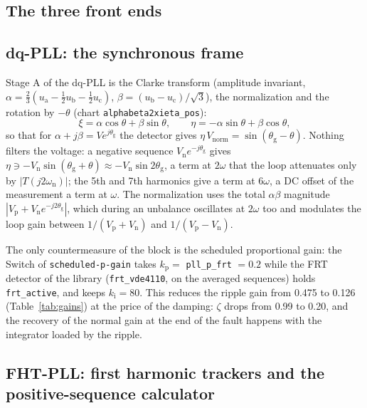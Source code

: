 \documentclass[11pt,a4paper]{scrartcl}
\newcommand{\ped}[1]{_{\mathrm{#1}}}
\newcommand{\code}[1]{\texttt{#1}}
\begin{document}
\begin{onehalfspace}
\section{The three front ends}
\label{sec:frontends}

\subsection{dq-PLL: the synchronous frame}
\label{sec:dq}

Stage A of the dq-PLL is the Clarke transform (amplitude invariant, $\alpha = \tfrac{2}{3}(u\ped{a} - \tfrac{1}{2}u\ped{b} - \tfrac{1}{2}u\ped{c})$, $\beta = (u\ped{b} - u\ped{c})/\sqrt{3}$), the normalization and the rotation by $-\theta$ (chart \code{alphabeta2xieta\_pos}):
\begin{equation}
	\xi = \alpha\cos\theta + \beta\sin\theta, \qquad \eta = -\alpha\sin\theta + \beta\cos\theta,
	\label{eq:rotpos}
\end{equation}
so that for $\alpha + j\beta = V e^{j\theta\ped{g}}$ the detector gives $\eta\, V\ped{norm} = \sin(\theta\ped{g} - \theta)$. Nothing filters the voltage: a negative sequence $V\ped{n} e^{-j\theta\ped{g}}$ gives $\eta \ni -V\ped{n}\sin(\theta\ped{g}+\theta) \approx -V\ped{n}\sin 2\theta\ped{g}$, a term at $2\omega$ that the loop attenuates only by $|T(j2\omega\ped{n})|$; the 5th and 7th harmonics give a term at $6\omega$, a DC offset of the measurement a term at $\omega$. The normalization uses the total $\alpha\beta$ magnitude $|V\ped{p} + V\ped{n} e^{-j2\theta\ped{g}}|$, which during an unbalance oscillates at $2\omega$ too and modulates the loop gain between $1/(V\ped{p}+V\ped{n})$ and $1/(V\ped{p}-V\ped{n})$.

The only countermeasure of the block is the scheduled proportional gain: the Switch of \code{scheduled-p-gain} takes $k\ped{p} = $ \code{pll\_p\_frt} $= 0.2$ while the FRT detector of the library (\code{frt\_vde4110}, on the averaged sequences) holds \code{frt\_active}, and keeps $k\ped{i} = 80$. This reduces the ripple gain from \num{0.475} to \num{0.126} (Table~\ref{tab:gains}) at the price of the damping: $\zeta$ drops from \num{0.99} to \num{0.20}, and the recovery of the normal gain at the end of the fault happens with the integrator loaded by the ripple.

\subsection{FHT-PLL: first harmonic trackers and the positive-sequence calculator}
\label{sec:fht}


\end{onehalfspace}
\end{document}
